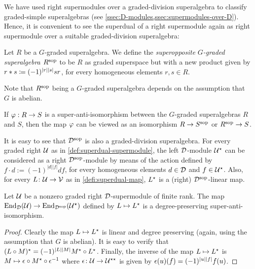 We have used right supermodules over a graded-division superalgebra to classify graded-simple superalgebras (see \cref{ssec:D-modules,ssec:supermodules-over-D}). 
Hence, it is convenient to see the superdual of a right supermodule again as right supermodule over a suitable graded-division superalgebra:

\begin{defi}\label{def:superopposite}
    Let $R$ be a $G$-graded superalgebra. 
    We define the \emph{superopposite $G$-graded superalgebra $R^{\mathrm{sop}}$} to be $R$ as graded superspace but with a new product given by $r * s \coloneqq (-1)^{|r||s|} sr$, for every homogeneous elements $r,s \in R$.
\end{defi}

Note that $R^{\mathrm{sop}}$ being a $G$-graded superalgebra depends on the assumption that $G$ is abelian. 

\begin{remark}\label{rmk:sop-super-anti-iso}
    If $\varphi:R \to S$ is a super-anti-isomorphism between the $G$-graded superalgebras $R$ and $S$, then the map $\varphi$ can be viewed as an isomorphism $R\to S^{\mathrm{sop}}$ or $R^{\mathrm{sop}} \to S$.
\end{remark}

It is easy to see that $\mathcal{D}^{\mathrm{sop}}$ is also a graded-division superalgebra. 
For every graded right $\mathcal U$ as in \cref{def:superdual-supermodule}, the left $\mathcal{D}$-module $\mathcal U^\star$ can be considered as a right $\mathcal{D}^{\mathrm{sop}}$-module by means of the action defined by $f\cdot d := (-1)^{|d||f|} df$, for every homogeneous elements $d\in \mathcal{D}$ and $f\in \mathcal U^\star$. 
Also, for every $L\colon \mathcal U \to \mathcal V$ as in \cref{defi:superdual-map}, $L^\star$ is a (right) $\mathcal{D}^{\mathrm{sop}}$-linear map. 

\begin{prop}\label{prop:dual-super-anti-iso}
    Let $\mathcal U$ be a nonzero graded right $\mathcal{D}$-supermodule of finite rank. 
    The map $\operatorname{End}_{\mathcal{D}} (\mathcal U) \rightarrow \operatorname{End}_{\mathcal{D}^{\mathrm{sop}}} (\mathcal U^\star)$ defined by $L \mapsto L^\star$ is a degree-preserving super-anti-isomorphism.
\end{prop}

\begin{proof}
    Clearly the map $L \mapsto L^\star$ is linear and degree preserving (again, using the assumption that $G$ is abelian). 
    It is easy to verify that $(L \circ M)^\star = (-1)^{|L||M|} M^\star \circ L^\star$. 
    Finally, the inverse of the map $L \mapsto L^\star$ is $M \mapsto \epsilon \circ M^\star \circ \epsilon^{-1}$ where $\epsilon\colon \mathcal U \to \mathcal U^{\star\star}$ is given by $\epsilon(u)(f) = (-1)^{|u||f|} f(u)$.
\end{proof}

